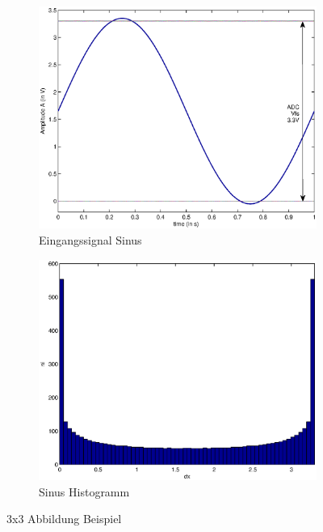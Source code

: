 \documentclass[TGAI_Laborbericht.tex]{subfiles}
\begin{document}
\begin{figure}[!ht]
\begin{subfigure}{.499\textwidth}
		\label{fig:GRUNDL_SIN_HIST_3X3}	
	\end{subfigure}
	\begin{subfigure}{.499\textwidth}
		\centering\small
		\includegraphics[width=\textwidth]{media/matlab/HISTOGRAM/sin_fkt_samples_5000.eps}
		\caption{Eingangssignal Sinus}
		\label{fig:GRUNDL_SIN_SIN_A_3X3}
	\end{subfigure}%
	\begin{subfigure}{.499\textwidth}
		\centering\small
		\includegraphics[width=\textwidth]{media/matlab/HISTOGRAM/sin_hist_samples_5000.eps}
		\caption{Sinus Histogramm}
		\label{fig:GRUNDL_SIN_HIST_A_3X3}
	\end{subfigure}	
\caption{3x3 Abbildung Beispiel}
\label{fig:GRUNDL_RAMP_SIN_HIST}
\end{figure}
\newpage
\end{document}
